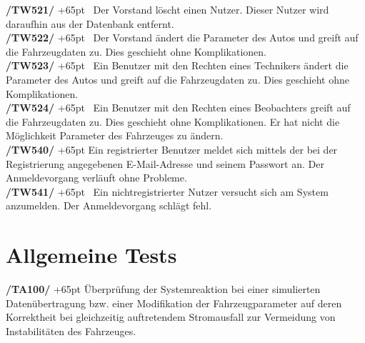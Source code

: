\documentclass[fontsize = 12pt, paper = a4]{scrreprt}
\begin{document}


\textbf{/TW521/} 
\hangindent+65pt 
\ Der Vorstand löscht einen Nutzer. Dieser Nutzer wird daraufhin aus der Datenbank entfernt. \\

\textbf{/TW522/} 
\hangindent+65pt 
\ Der Vorstand ändert die Parameter des Autos und greift auf die Fahrzeugdaten zu. Dies geschieht ohne Komplikationen. \\

\textbf{/TW523/} 
\hangindent+65pt 
\ Ein Benutzer mit den \gls{Recht}en eines Technikers  ändert die Parameter des Autos und greift auf die Fahrzeugdaten zu. Dies geschieht ohne Komplikationen. \\

\textbf{/TW524/} 
\hangindent+65pt 
\ Ein Benutzer mit den \gls{Recht}en eines Beobachters greift auf die Fahrzeugdaten zu. Dies geschieht ohne Komplikationen. Er hat nicht die Möglichkeit Parameter des Fahrzeuges zu ändern. \\

\textbf{/TW540/} 
\hangindent+65pt 
\hspace*{1mm}Ein registrierter Benutzer meldet sich mittels der bei der Registrierung angegebenen E-Mail-Adresse und seinem  Passwort an. Der Anmeldevorgang verläuft ohne Probleme. \\

\textbf{/TW541/} 
\hangindent+65pt 
\ Ein nichtregistrierter Nutzer versucht sich am System anzumelden. Der Anmeldevorgang schlägt fehl. \\
  
\vspace*{-0.5cm} 




\section{Allgemeine Tests}

  \textbf{/TA100/} 
  \hangindent+65pt 
 \hspace*{0.1cm} Überprüfung der Systemreaktion bei einer simulierten Datenübertragung bzw. einer Modifikation der Fahrzeugparameter auf deren Korrektheit bei gleichzeitig auftretendem Stromausfall zur Vermeidung von Instabilitäten des Fahrzeuges. \\
  
\end{document}

